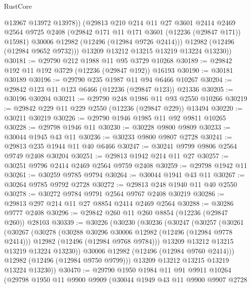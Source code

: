 \begin{lexlean}{RustCore}
\begin{coremodule}
              @13967
              @13972
              @13978))
          (@29813
            @210
            @214
            @11
            @27
            @3601
            @2414
            @2469
            @2564
            @9725
            @2408
            (@29842 @171 @11 @171 @3601 (@12236 (@29847 @171)) @15981)
            @30006
            @12982
            (@12496 (@12984 @9726 @2414)))
          @12982
          (@12496 (@12984 @9652 @9732)))
        @13209
        @13212
        @13215
        @13219
        @13224
        @13230))
@30181 := @29790 @212 @1988 @11 @95 @3729 @10268
@30189 := @29842 @192 @11 @192 @3729 (@12236 (@29847 @192)) @16193
@30190 := @30181 @30189
@30196 := @29790 @235 @1987 @11 @94 @6466 @10267
@30204 := @29842 @123 @11 @123 @6466 (@12236 (@29847 @123)) @21336
@30205 := @30196 @30204
@30211 := @29790 @248 @1986 @11 @93 @2550 @10266
@30219 := @29842 @229 @11 @229 @2550 (@12236 (@29847 @229)) @13494
@30220 := @30211 @30219
@30226 := @29790 @1946 @1985 @11 @92 @9811 @10265
@30228 := @29798 @1946 @11
@30230 := @30228 @9800 @9809
@30233 := @30044 @1945 @43 @11
@30236 := @30233 @9800 @9807 @2728
@30241 := @29813 @235 @1944 @11 @40 @6466
@30247 := @30241 @9799 @9806 @2564 @9749 @2408 @30204
@30251 := @29813 @1942 @214 @11 @27
@30257 := @30251 @9796 @2414 @2469 @2564 @9759 @2408
@30259 := @29798 @1942 @11
@30261 := @30259 @9785 @9794
@30264 := @30044 @1941 @43 @11
@30267 := @30264 @9785 @9792 @2728
@30272 := @29813 @248 @1940 @11 @40 @2550
@30278 := @30272 @9784 @9791 @2564 @9767 @2408 @30219
@30286 := @29813 @297 @214 @11 @27 @8854 @2414 @2469 @2564
@30288 := @30286 @9777 @2408
@30296 := @29842 @260 @11 @260 @8854 (@12236 (@29847 @260)) @28103
@30339 := @30226
    (@30230
      (@30236
        (@30247
          (@30257
            (@30261
              (@30267
                (@30278
                  (@30288 @30296 @30006 @12982 (@12496 (@12984 @9778 @2414)))
                  @12982
                  (@12496 (@12984 @9768 @9784)))
                @13209
                @13212
                @13215
                @13219
                @13224
                @13230))
            @30006
            @12982
            (@12496 (@12984 @9760 @2414)))
          @12982
          (@12496 (@12984 @9750 @9799)))
        @13209
        @13212
        @13215
        @13219
        @13224
        @13230))
@30470 := @29790
    @1950
    @1984
    @11
    @91
    @9911
    @10264
    (@29798
      @1950
      @11
      @9900
      @9909
      (@30044
        @1949
        @43
        @11
        @9900
        @9907
        @2728

\end{coremodule}
\end{lexlean}
